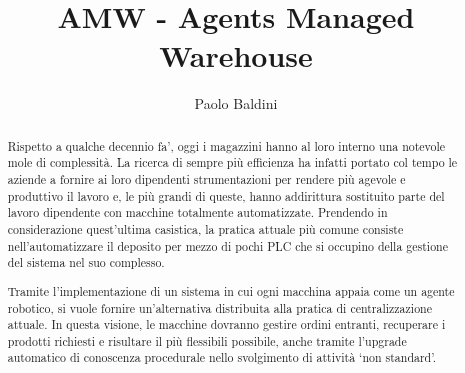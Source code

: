 \documentclass{scrartcl}
\title{\LARGE
    AMW - Agents Managed Warehouse
}
\author{
    Paolo Baldini \\ \emailaddr{paolo.baldini6@studio.unibo.it}
}
\newcommand{\parag}{\vspace{6pt}\par}
\begin{document}
\maketitle


\begin{abstract}
Rispetto a qualche decennio fa', oggi i magazzini hanno al loro interno una notevole mole di complessità. La ricerca di sempre più efficienza ha infatti portato col tempo le aziende a fornire ai loro dipendenti strumentazioni per rendere più agevole e produttivo il lavoro e, le più grandi di queste, hanno addirittura sostituito parte del lavoro dipendente con macchine totalmente automatizzate. Prendendo in considerazione quest’ultima casistica, la pratica attuale più comune consiste nell’automatizzare il deposito per mezzo di pochi PLC che si occupino della gestione del sistema nel suo complesso.

\parag
Tramite l'implementazione di un sistema in cui ogni macchina appaia come un agente robotico, si vuole fornire un’alternativa distribuita alla pratica di centralizzazione attuale. In questa visione, le macchine dovranno gestire ordini entranti, recuperare i prodotti richiesti e risultare il più flessibili possibile, anche tramite l'upgrade automatico di conoscenza procedurale nello svolgimento di attività `non standard'.
\end{abstract}
\newpage

\tableofcontents
\newpage




















\end{document}
